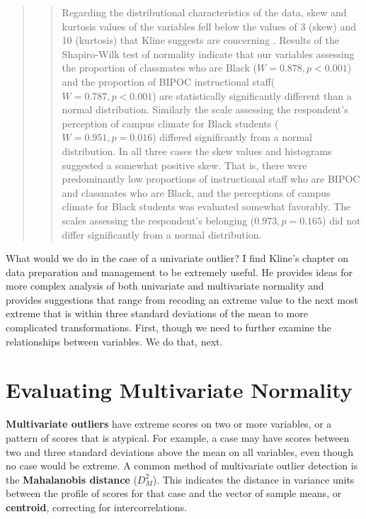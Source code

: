 \documentclass[
  11pt,
]{book}
\begin{document}
\begin{quote}
\begin{quote}
Regarding the distributional characteristics of the data, skew and kurtosis values of the variables fell below the values of 3 (skew) and 10 (kurtosis) that Kline suggests are concerning \citeyearpar{kline_principles_2016}. Results of the Shapiro-Wilk test of normality indicate that our variables assessing the proportion of classmates who are Black (\(W = 0.878, p < 0.001\)) and the proportion of BIPOC instructional staff(\(W = 0.787, p < 0.001\)) are statistically significantly different than a normal distribution. Similarly the scale assessing the respondent's perception of campus climate for Black students (\(W = 0.951, p = 0.016\)) differed significantly from a normal distribution. In all three cases the skew values and histograms suggested a somewhat positive skew. That is, there were predominantly low proportions of instructional staff who are BIPOC and classmates who are Black, and the perceptions of campus climate for Black students was evaluated somewhat favorably. The scales assessing the respondent's belonging (\(0.973, p = 0.165\)) did not differ significantly from a normal distribution.
\end{quote}
\end{quote}

What would we do in the case of a univariate outlier? I find Kline's \citeyearpar{kline_principles_2016} chapter on data preparation and management to be extremely useful. He provides ideas for more complex analysis of both univariate and multivariate normality and provides suggestions that range from recoding an extreme value to the next most extreme that is within three standard deviations of the mean to more complicated transformations. First, though we need to further examine the relationships between variables. We do that, next.

\hypertarget{evaluating-multivariate-normality}{%
\section{Evaluating Multivariate Normality}\label{evaluating-multivariate-normality}}

\textbf{Multivariate outliers} have extreme scores on two or more variables, or a pattern of scores that is atypical. For example, a case may have scores between two and three standard deviations above the mean on all variables, even though no case would be extreme. A common method of multivariate outlier detection is the \textbf{Mahalanobis distance} (\(D_{M}^{2}\)). This indicates the distance in variance units between the profile of scores for that case and the vector of sample means, or \textbf{centroid}, correcting for intercorrelations.
\end{document}
